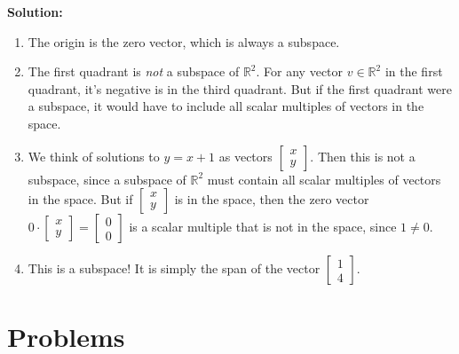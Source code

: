 \documentclass[11pt]{article}
\newcommand{\rr}{\mathbb{R}}
\begin{document}
\begin{enumerate}
\begin{enumerate}
\end{enumerate}
\textbf{Solution:} 
\begin{enumerate}
\item The origin is the zero vector, which is always a subspace.
\item The first quadrant is \emph{not} a subspace of $\rr^2$.  For any vector $v \in \rr^2$ in the first quadrant, it's negative is in the third quadrant.  But if the first quadrant were a subspace, it would have to include all scalar multiples of vectors in the space.
\item We think of solutions to $y = x + 1$ as vectors $\begin{bmatrix} x \\ y \end{bmatrix}$.  Then this is not a subspace, since a subspace of $\rr^2$ must contain all scalar multiples of vectors in the space.  But if $\begin{bmatrix} x \\ y \end{bmatrix}$ is in the space, then the zero vector $0 \cdot \begin{bmatrix} x \\ y \end{bmatrix} = \begin{bmatrix} 0 \\ 0 \end{bmatrix}$ is a scalar multiple that is not in the space, since $1 \neq 0$.
\item This is a subspace!  It is simply the span of the vector $\begin{bmatrix} 1 \\ 4 \end{bmatrix}$.
\end{enumerate}
\end{enumerate}

\section{Problems}
\end{document}
